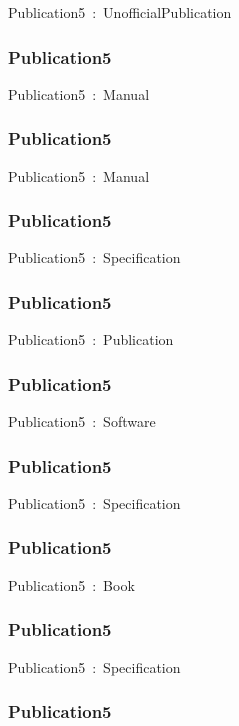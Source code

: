 \documentclass{article}
\begin{document}
Publication5~:~UnofficialPublication

\subsubsection*{Publication5}

Publication5~:~Manual

\subsubsection*{Publication5}

Publication5~:~Manual

\subsubsection*{Publication5}

Publication5~:~Specification

\subsubsection*{Publication5}

Publication5~:~Publication

\subsubsection*{Publication5}

Publication5~:~Software

\subsubsection*{Publication5}

Publication5~:~Specification

\subsubsection*{Publication5}

Publication5~:~Book

\subsubsection*{Publication5}

Publication5~:~Specification

\subsubsection*{Publication5}
\end{document}
